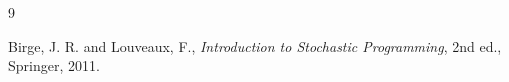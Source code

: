 \documentclass[oneside,openany]{memoir}%
\newcommand{\1}{\mathbf{1}}
\begin{document}
\backmatter

\begin{thebibliography}{9}







Birge, J. R. and Louveaux, F., \textit{Introduction to Stochastic Programming}, 2nd ed., Springer, 2011.


\end{thebibliography}
\end{document}
